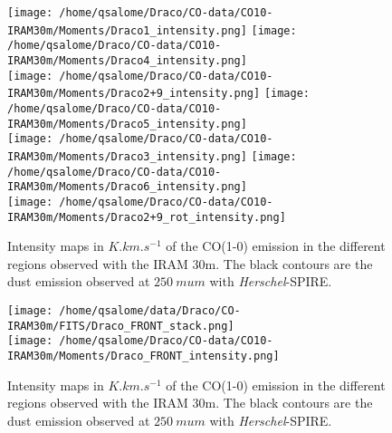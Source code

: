 \documentclass[traditabstract]{aa}
\begin{document}
\begin{figure*}[h]
  \centering
  \texttt{[image: /home/qsalome/Draco/CO-data/CO10-IRAM30m/Moments/Draco1\_intensity.png]}
  \hspace{3mm}
  \texttt{[image: /home/qsalome/Draco/CO-data/CO10-IRAM30m/Moments/Draco4\_intensity.png]} \\
  \texttt{[image: /home/qsalome/Draco/CO-data/CO10-IRAM30m/Moments/Draco2+9\_intensity.png]}
  \hspace{3mm}
  \texttt{[image: /home/qsalome/Draco/CO-data/CO10-IRAM30m/Moments/Draco5\_intensity.png]} \\
  \texttt{[image: /home/qsalome/Draco/CO-data/CO10-IRAM30m/Moments/Draco3\_intensity.png]}
  \hspace{3mm}
  \texttt{[image: /home/qsalome/Draco/CO-data/CO10-IRAM30m/Moments/Draco6\_intensity.png]} \\
  \texttt{[image: /home/qsalome/Draco/CO-data/CO10-IRAM30m/Moments/Draco2+9\_rot\_intensity.png]}
  \caption{\label{Draco_CO10} Intensity maps in $K.km.s^{-1}$ of the CO(1-0) emission in the different regions observed with the IRAM 30m. The black contours are the dust emission observed at $250\: mu m$ with \emph{Herschel}-SPIRE.}
\end{figure*}

\begin{figure*}[h]
  \centering
  \texttt{[image: /home/qsalome/data/Draco/CO-IRAM30m/FITS/Draco\_FRONT\_stack.png]} \\
  \texttt{[image: /home/qsalome/Draco/CO-data/CO10-IRAM30m/Moments/Draco\_FRONT\_intensity.png]}
  \caption{\label{Draco_CO10} Intensity maps in $K.km.s^{-1}$ of the CO(1-0) emission in the different regions observed with the IRAM 30m. The black contours are the dust emission observed at $250\: mu m$ with \emph{Herschel}-SPIRE.}
\end{figure*}

\end{document}
